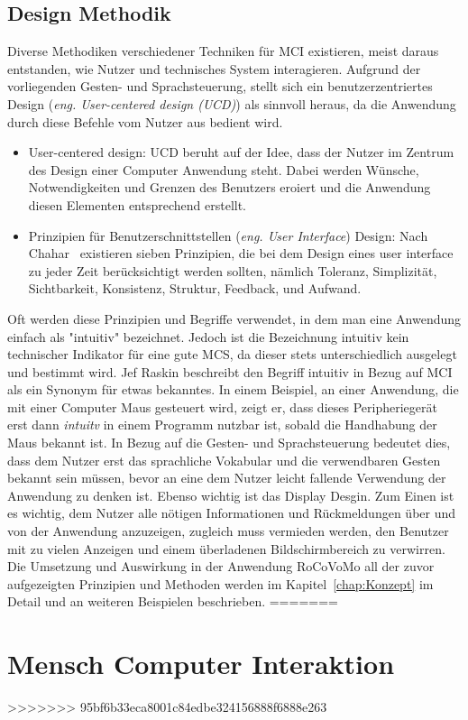 \section{Design Methodik}
Diverse Methodiken verschiedener Techniken f\"ur \gls{MCI} existieren, meist daraus entstanden, wie Nutzer und technisches System interagieren. Aufgrund der vorliegenden Gesten- und Sprachsteuerung, stellt sich ein benutzerzentriertes Design (\textit{eng. User-centered design (UCD)}) als sinnvoll heraus, da die Anwendung durch diese Befehle vom Nutzer aus bedient wird.
\begin{itemize}
\item User-centered design: UCD beruht auf der Idee, dass der Nutzer im Zentrum des Design einer Computer Anwendung steht. Dabei werden W\"unsche, Notwendigkeiten und Grenzen des Benutzers eroiert und die Anwendung diesen Elementen entsprechend erstellt.
\item Prinzipien f\"ur Benutzerschnittstellen (\textit{eng. User Interface}) Design: Nach Chahar~\cite{bib:Chahar} existieren sieben Prinzipien, die bei dem Design eines user interface zu jeder Zeit ber\"ucksichtigt werden sollten, n\"amlich Toleranz, Simplizit\"at, Sichtbarkeit, Konsistenz, Struktur, Feedback, und Aufwand.
\end{itemize}
Oft werden diese Prinzipien und Begriffe verwendet, in dem man eine Anwendung einfach als "intuitiv" bezeichnet. Jedoch ist die Bezeichnung intuitiv kein technischer Indikator f\"ur eine gute \gls{MCS}, da dieser stets unterschiedlich ausgelegt und bestimmt wird. Jef Raskin \cite{bib:Raskin} beschreibt den Begriff intuitiv in Bezug auf \gls{MCI} als ein Synonym f\"ur etwas bekanntes. In einem Beispiel, an einer Anwendung, die mit einer Computer Maus gesteuert wird, zeigt er, dass dieses Peripherieger\"at erst dann \textit{intuitv} in einem Programm nutzbar ist, sobald die Handhabung der Maus bekannt ist. In Bezug auf die Gesten- und Sprachsteuerung bedeutet dies, dass dem Nutzer erst das sprachliche Vokabular und die verwendbaren Gesten bekannt sein m\"ussen, bevor an eine dem Nutzer leicht fallende Verwendung der Anwendung zu denken ist.
\newline
Ebenso wichtig ist das Display Desgin. Zum Einen ist es wichtig, dem Nutzer alle n\"otigen Informationen und R\"uckmeldungen \"uber und von der Anwendung anzuzeigen, zugleich muss vermieden werden, den Benutzer mit zu vielen Anzeigen und einem \"uberladenen Bildschirmbereich zu verwirren.
\newline
Die Umsetzung und Auswirkung in der Anwendung RoCoVoMo all der zuvor aufgezeigten Prinzipien und Methoden werden im Kapitel~\ref{chap:Konzept} im Detail und an weiteren Beispielen beschrieben.
=======
\chapter{Mensch Computer Interaktion}
\label{chap:MenschComputerInteraktion}

>>>>>>> 95bf6b33eca8001c84edbe324156888f6888e263
